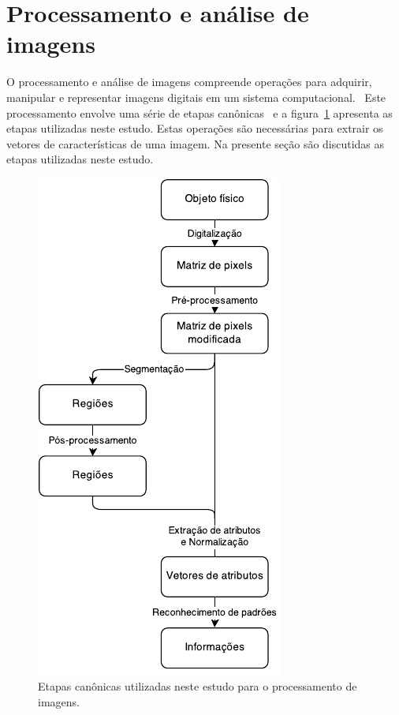 \section{Processamento e análise de imagens}
\label{sec:fund:imagens}

O processamento e análise de imagens compreende operações para
adquirir, manipular e representar imagens digitais em um sistema
computacional.~\cite{gonzalez} Este processamento envolve uma série de
etapas canônicas~\cite{luciano} e a figura~\ref{fig:etapas-pdi}
apresenta as etapas utilizadas neste estudo. Estas operações são
necessárias para extrair os vetores de características de uma
imagem. Na presente seção são discutidas as etapas utilizadas neste
estudo.

\begin{figure}[ht!]
\begin{center}
 \caption{Etapas
      canônicas utilizadas neste estudo para o processamento de
      imagens.}  
\label{fig:etapas-pdi}
        \includegraphics[scale=1.]{figs/etapas_pdi} 
\fonteminha
\end{center}
\end{figure}

